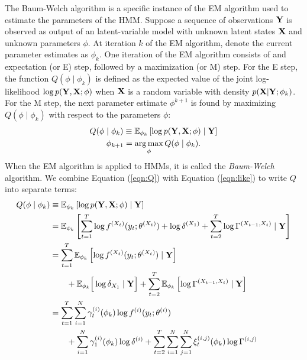 The Baum-Welch algorithm is a specific instance of the EM algorithm used to estimate the parameters of the HMM. Suppose a sequence of observations $\mathbf{Y}$ is observed as output of an latent-variable model with unknown latent states $\mathbf{X}$ and unknown parameters $\phi$. At iteration $k$ of the EM algorithm, denote the current parameter estimates as $\phi_{k}$. One iteration of the EM algorithm consists of and expectation (or E) step, followed by a maximization (or M) step. For the E step, the function $Q(\phi \mid \phi_{k})$ is defined as the expected value of the joint log-likelihood $\log p(\mathbf{Y},\mathbf{X}; \phi)$ when $\mathbf{X}$ is a random variable with density $p(\mathbf{X} | \mathbf{Y} ; \phi_{k})$. For the M step, the next parameter estimate $\phi^{k+1}$ is found by maximizing $Q(\phi \mid \phi_{k})$ with respect to the parameters $\phi$:
%
\begin{gather}
    Q(\phi \mid \phi_{k}) \equiv \mathbb{E}_{\phi_{k}}\left[\log p(\mathbf{Y},\mathbf{X};\phi) \mid \mathbf{Y} \right] \label{eqn:Q} \\
    \phi_{k+1} = \operatorname*{arg\,max}_{\phi} Q(\phi \mid \phi_{k}). \label{eqn:BW_update}
\end{gather}
%
When the EM algorithm is applied to HMMs, it is called the \textit{Baum-Welch} algorithm. We combine Equation (\ref{eqn:Q}) with Equation (\ref{eqn:like}) to write $Q$ into separate terms: %
\begin{align}
    Q(\phi \mid \phi_{k}) &\equiv \mathbb{E}_{\phi_{k}}\left[\log p(\mathbf{Y},\mathbf{X};\phi) \mid \mathbf{Y} \right] \\
    &= \mathbb{E}_{\phi_{k}} \left[\sum_{t=1}^T \log f^{(X_t)}(y_t;\theta^{(X_t)}) + \log \delta^{(X_1)} + \sum_{t=2}^{T} \log \Gamma^{(X_{t-1},X_{t})} \mid \mathbf{Y} \right] \\
    &= \sum_{t = 1}^T \mathbb{E}_{\phi_{k}} \left[ \log f^{(X_t)}(y_t;\theta^{(X_t)}) \mid \mathbf{Y} \right]  \\
    & \qquad + \mathbb{E}_{\phi_{k}} \Big[\log \delta_{X_1} \mid \mathbf{Y} \Big] + \sum_{t=2}^{T} \mathbb{E}_{\phi_{k}} \left[ \log \Gamma^{(X_{t-1},X_{t})} \mid \mathbf{Y} \right] \\
    &= \sum_{t = 1}^T \sum_{i=1}^N \gamma^{(i)}_t(\phi_{k}) \log f^{(i)}(y_t;\theta^{(i)}) \\
    & \qquad + \sum_{i=1}^N \gamma^{(i)}_1(\phi_{k}) \log \delta^{(i)} + \sum_{t=2}^{T} \sum_{i=1}^N \sum_{j=1}^N \xi_t^{(i,j)}(\phi_{k}) \log \Gamma^{(i,j)}
\end{align}
